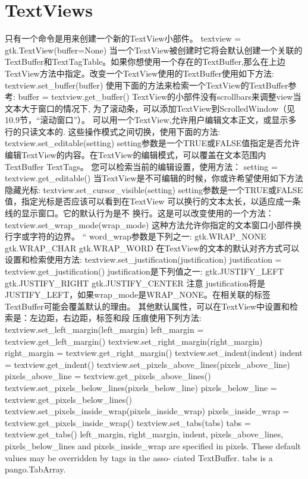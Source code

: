\section{TextViews}
只有一个命令是用来创建一个新的TextView小部件。
textview = gtk.TextView(buffer=None)
当一个TextView被创建时它将会默认创建一个关联的TextBuffer和TextTagTable。如果你想使用一个存在的TextBuffer,那么在上边TextView方法中指定。改变一个TextView使用的TextBuffer使用如下方法:
textview.set_buffer(buffer)
使用下面的方法来检索一个TextView的TextBuffer参考:
buffer = textview.get_buffer()
TextView的小部件没有scrollbars来调整view当文本大于窗口的情况下,
为了滚动条，可以添加TextView到ScrolledWindow（见10.9节，“滚动窗口”）。
可以用一个TextView,允许用户编辑文本正文，或显示多行的只读文本的.
这些操作模式之间切换，使用下面的方法:
textview.set_editable(setting)
setting参数是一个TRUE或FALSE值指定是否允许编辑TextView的内容。在TextView的编辑模式，可以覆盖在文本范围内TextBuffer TextTags。
您可以检索当前的编辑设置，使用方法：
setting = textview.get_editable()
当TextView是不可编辑的时候，你或许希望使用如下方法隐藏光标:
textview.set_cursor_visible(setting)
setting参数是一个TRUE或FALSE值，指定光标是否应该可以看到在TextView
可以换行的文本太长，以适应成一条线的显示窗口。它的默认行为是不
换行。这是可以改变使用的一个方法：
textview.set_wrap_mode(wrap_mode)
这种方法允许你指定的文本窗口小部件换行字或字符的边界。 “
word_wrap参数是下列之一:
gtk.WRAP_NONE
gtk.WRAP_CHAR
gtk.WRAP_WORD
在TextView的文本的默认对齐方式可以设置和检索使用方法:
textview.set_justification(justification)
justification = textview.get_justification()
justification是下列值之一:
gtk.JUSTIFY_LEFT
gtk.JUSTIFY_RIGHT
gtk.JUSTIFY_CENTER
注意
justification将是JUSTIFY_LEFT，如果wrap_mode是WRAP_NONE。在相关联的标签
TextBuffer可能会覆盖默认的理由。
其他默认属性，可以在TextView中设置和检索是：左边距，右边距，标签和段
压痕使用下列方法:
textview.set_left_margin(left_margin)
left_margin = textview.get_left_margin()
textview.set_right_margin(right_margin)
right_margin = textview.get_right_margin()
textview.set_indent(indent)
indent = textview.get_indent()
textview.set_pixels_above_lines(pixels_above_line)
pixels_above_line = textview.get_pixels_above_lines()
textview.set_pixels_below_lines(pixels_below_line)
pixels_below_line = textview.get_pixels_below_lines()
textview.set_pixels_inside_wrap(pixels_inside_wrap)
pixels_inside_wrap = textview.get_pixels_inside_wrap()
textview.set_tabs(tabs)
tabs = textview.get_tabs()
left_margin, right_margin, indent, pixels_above_lines, pixels_below_lines and
pixels_inside_wrap are specified in pixels. These default values may be overridden by tags in the asso-
ciated TextBuffer. tabs is a pango.TabArray.

